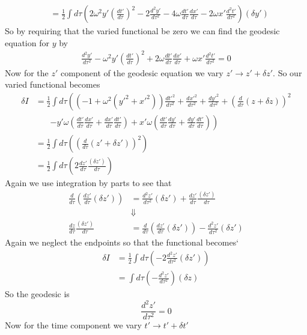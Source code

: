 \documentclass[11pt]{article}
\numberwithin{equation}{section}
\begin{document}
\begin{enumerate}[(a)]
\begin{align*}
&= \frac{1}{2}\int d\tau \left(2\omega^2y'\left(\frac{dt'}{d\tau}\right)^2  -  2\frac{d^2y'}{d\tau^2} - 4\omega\frac{dt'}{d\tau}\frac{dx'}{d\tau}   - 2\omega x'\frac{d^2t'}{d\tau^2} \right)(\delta y')
\end{align*}
So by requiring that the varied functional be zero we can find the geodesic equation for $y$ by
\begin{align*}
 \frac{d^2y'}{d\tau^2}  - \omega^2y'\left(\frac{dt'}{d\tau}\right)^2  +  2\omega\frac{dt'}{d\tau}\frac{dx'}{d\tau}  + \omega x'\frac{d^2t'}{d\tau^2} = 0
\end{align*}
Now for the $z'$ component of the geodesic equation we vary $z'\rightarrow z'+\delta z'$. So our varied functional becomes 
\begin{align*}
\delta I &= \frac{1}{2}\int d\tau \left(\left(-1 + \omega^2(y'^2 + x'^2)\right)\frac{dt'^2}{d\tau^2} + \frac{dx'^2}{d\tau^2} + \frac{dy'^2}{d\tau^2}  + \left(\frac{d}{d\tau}(z+\delta z)\right)^2\right.\\
&\ \ \ \ \ \ \ \ \left. - y'\omega\left(\frac{dt'}{d\tau}\frac{dx'}{d\tau} + \frac{dx'}{d\tau}\frac{dt'}{d\tau}\right) + x'\omega \left(\frac{dt'}{d\tau}\frac{dy'}{d\tau} + \frac{dy'}{d\tau}\frac{dt'}{d\tau}\right)\right)\\
&= \frac{1}{2}\int d\tau \left( \left(\frac{d}{d\tau}(z'+\delta z')\right)^2\right)\\
&= \frac{1}{2}\int d\tau \left(2\frac{dz'}{d\tau}\frac{(\delta z')}{d\tau}\right)
\end{align*}
Again we use integration by parts to see that
\begin{align*}
\frac{d}{d\tau}\left(\frac{dz'}{d\tau}(\delta z')\right) &= \frac{d^2z'}{d\tau^2}(\delta z') + \frac{dz'}{d\tau}\frac{(\delta z')}{d\tau}\\
&\Downarrow\\
\frac{dz}{d\tau}\frac{(\delta z')}{d\tau} &= \frac{d}{d\tau}\left(\frac{dz'}{d\tau}(\delta z')\right) - \frac{d^2z'}{d\tau^2}(\delta z')
\end{align*}
Again we neglect the endpoints so that the functional becomes`
\begin{align*}
\delta I &= \frac{1}{2}\int d\tau \left(-2\frac{d^2z'}{d\tau^2}(\delta z')\right)\\
&= \int d\tau \left(-\frac{d^2z'}{d\tau^2}\right)(\delta z)
\end{align*}
So the geodesic is
$$\frac{d^2z'}{d\tau^2} = 0$$
Now for the time component we vary $t'\rightarrow t'+\delta t'$
\begin{align*}

\end{align*}
\end{enumerate}
\end{document}
